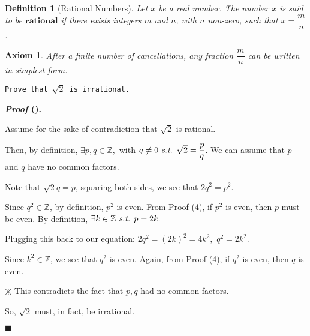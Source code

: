 \documentclass[12pt,a4paper]{article}
\newcounter{nprf}[subsection]
\newtheorem{df}{Definition}[subsection]
\newtheorem{ax}{Axiom}[section]
\newenvironment*{prf}{\par\indent\textbf{\textit{Proof} (\stepcounter{nprf}\thenprf). }\par}{\par\hfill $\blacksquare$\par}
\def\Z{{\mathbb{Z}}}
\def\st{\emph{ s.t. }}
\begin{document}
\begin{df}[Rational Numbers]
	Let $x$ be a real number. The number $x$ is said to be $\textbf{rational}$ if there exists integers $m$ and $n$, with $n$ non-zero, such that $x=\dfrac{m}{n}$.	
\end{df}
\begin{ax}
	After a finite number of cancellations, any	fraction $\dfrac{m}{n}$ can be written in simplest form. 
\end{ax}
\begin{framed}
\noindent\texttt{Prove that $\sqrt{2}$ is irrational.}
\begin{prf}
	Assume for the sake of contradiction that $\sqrt{2}$ is rational. \par Then, by definition, $\exists p,q\in\Z,$ with $q\neq0\st\sqrt{2}=\dfrac{p}{q}$. We can assume that $p$ and $q$ have no common factors. \par Note that $\sqrt{2}q=p$, squaring both sides, we see that $2q^2=p^2$.\par Since $q^2\in\Z$, by definition, $p^2$ is even. From Proof (4), if $p^2$ is even, then $p$ must be even. By definition, $\exists k\in\Z\st p=2k.$\par Plugging this back to our equation: $2q^2=(2k)^2=4k^2,$ $q^2=2k^2$.\par Since $k^2\in\Z$, we see that $q^2$ is even. Again, from Proof (4), if $q^2$ is even, then $q$ is even. \par \begin{center}$\divideontimes$ This contradicts the fact that $p,q$ had no common factors.\end{center}\par So, $\sqrt{2}$ must, in fact, be irrational. 
\end{prf}	
\end{framed}
\end{document}
